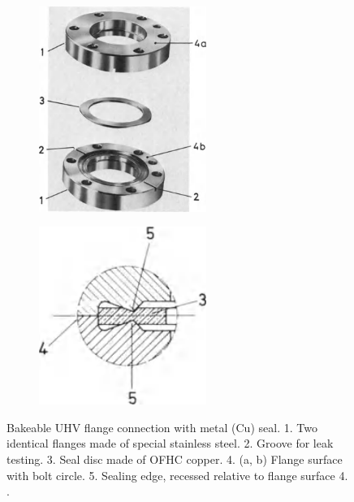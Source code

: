 \begin{figure}[H]
    \centering
    \begin{subfigure}{0.49\textwidth}
        \centering
        \includegraphics[width=0.6\textwidth]{sections/imges/seals/copper_seal.png}
        \label{fig:copper_gasket}
    \end{subfigure}
    \hfill
    \begin{subfigure}{0.49\textwidth}
        \centering
        \includegraphics[width=0.6\textwidth]{sections/imges/seals/copper_seal_side.png}
        \label{fig:copper_gasket_flange}
    \end{subfigure}
    \caption{Bakeable UHV flange connection with metal (Cu) seal.
        1. Two identical flanges made of special stainless steel.
        2. Groove for leak testing.
        3. Seal disc made of OFHC copper.
        4. (a, b) Flange surface with bolt circle.
        5. Sealing edge, recessed relative to flange surface 4.
        \cite{Wutz2000}.}
\end{figure}



